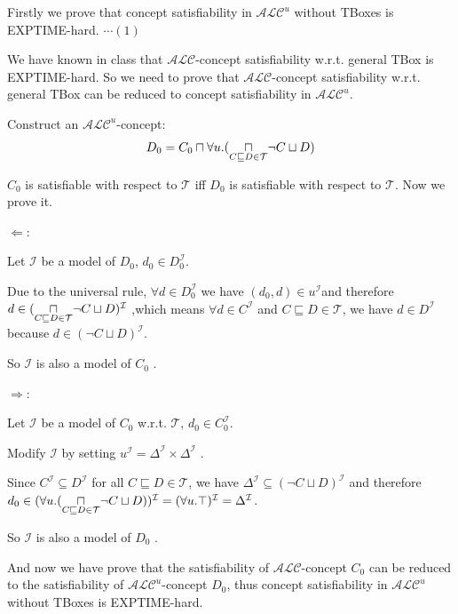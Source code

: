 \documentclass[12pt]{article}
\begin{document}
    Firstly we prove that concept satisfiability in $\mathcal{ALC}^{u}$ without TBoxes is EXPTIME-hard. $\cdots (1)$\par
    We have known in class that $\mathcal{ALC}$-concept satisfiability w.r.t. general TBox is EXPTIME-hard. So we need to prove that $\mathcal{ALC}$-concept satisfiability w.r.t. general TBox can be reduced to concept satisfiability in $\mathcal{ALC}^{u}$. \par
    Construct an $\mathcal{ALC}^{u}$-concept:
    $$
    D_0 = C_0 \sqcap \forall u.(\underset{C \sqsubseteq D \in \mathcal{T}}{\Large \sqcap} \lnot C \sqcup D)
    $$\par
    $C_0$ is satisfiable with respect to $\mathcal{T}$ iff $D_0$ is satisfiable with respect to $\mathcal{T}$. Now we prove it. \par
    $\Longleftarrow:$ \par
    Let $\mathcal{I}$ be a model of $D_0$, $d_0 \in D_0^{\mathcal{I}}$. \par
    Due to the universal rule, $\forall d \in D_0^{\mathcal{I}}$ we have $(d_0, d) \in u^{\mathcal{I}}$and therefore $d \in (\underset{C \sqsubseteq D \in \mathcal{T}}{\Large \sqcap} \lnot C \sqcup D)^{\mathcal{I}}$ ,which means $\forall d \in C^{\mathcal{I}}$ and $C \sqsubseteq D \in \mathcal{T}$, we have $d \in D^{\mathcal{I}}$ because $d \in (\lnot C \sqcup D)^{\mathcal{I}}$. \par
    So $\mathcal{I}$ is also a model of $C_0$ . \par
    $\Longrightarrow:$ \par
    Let $\mathcal{I}$ be a model of $C_0$ w.r.t. $\mathcal{T}$, $d_0 \in C_0^{\mathcal{I}}$. \par
    Modify $\mathcal{I}$ by setting $u^{\mathcal{I}}=\Delta^{\mathcal{I}} \times \Delta^{\mathcal{I}}$ . \par
    Since $C^{\mathcal{I}} \subseteq D^{\mathcal{I}}$ for all $C \sqsubseteq D \in \mathcal{T}$, we have $\Delta^{\mathcal{I}} \subseteq (\lnot C \sqcup D)^{\mathcal{I}}$ and therefore  $d_0 \in (\forall u.(\underset{C \sqsubseteq D \in \mathcal{T}}{\Large \sqcap} \lnot C \sqcup D))^{\mathcal{I}} = (\forall u.\top)^{\mathcal{I}} = \Delta^{\mathcal{I}}$.\par
    So $\mathcal{I}$ is also a model of $D_0$ . \par
    And now we have prove that the satisfiability of $\mathcal{ALC}$-concept $C_0$ can be reduced to the satisfiability of $\mathcal{ALC}^{u}$-concept $D_0$, thus concept satisfiability in $\mathcal{ALC}^{u}$ without TBoxes is EXPTIME-hard. \par
\end{document}
